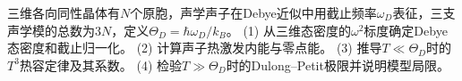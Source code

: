 三维各向同性晶体有\(N\)个原胞，声学声子在Debye近似中用截止频率\(\omega_D\)表征，三支声学模的总数为\(3N\)，定义\(\Theta_D=\hbar\omega_D/k_B\)。
(1) 从三维态密度的\(\omega^2\)标度确定Debye态密度和截止归一化。
(2) 计算声子热激发内能与零点能。
(3) 推导\(T\ll\Theta_D\)时的\(T^3\)热容定律及其系数。
(4) 检验\(T\gg\Theta_D\)时的Dulong–Petit极限并说明模型局限。
